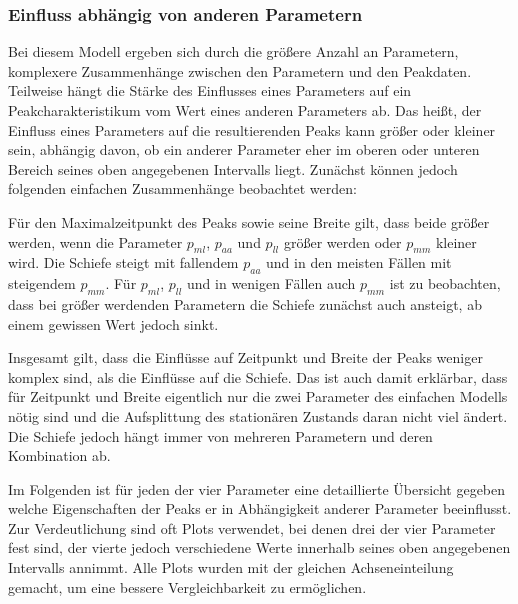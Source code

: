 

\subsubsection{Einfluss abhängig von anderen Parametern}

Bei diesem Modell ergeben sich durch die größere Anzahl an Parametern, komplexere Zusammenhänge zwischen den Parametern und den Peakdaten. Teilweise hängt die Stärke des Einflusses eines Parameters auf ein Peakcharakteristikum vom Wert eines anderen Parameters ab. Das heißt, der Einfluss eines Parameters auf die resultierenden Peaks kann größer oder kleiner sein, abhängig davon, ob ein anderer Parameter eher im oberen oder unteren Bereich seines oben angegebenen Intervalls liegt.
Zunächst können jedoch folgenden einfachen Zusammenhänge beobachtet werden:

Für den Maximalzeitpunkt des Peaks sowie seine Breite gilt, dass beide größer werden, wenn die Parameter $p_{ml}$, $p_{aa}$ und $p_{ll}$ größer werden oder $p_{mm}$ kleiner wird. 
Die Schiefe steigt mit fallendem $p_{aa}$ und in den meisten Fällen mit steigendem $p_{mm}$. Für $p_{ml}$, $p_{ll}$ und in wenigen Fällen auch $p_{mm}$ ist zu beobachten, dass bei größer werdenden Parametern die Schiefe zunächst auch ansteigt, ab einem gewissen Wert jedoch sinkt.

Insgesamt gilt, dass die Einflüsse auf Zeitpunkt und Breite der Peaks weniger komplex sind, als die Einflüsse auf die Schiefe. Das ist auch damit erklärbar, dass für Zeitpunkt und Breite eigentlich nur die zwei Parameter des einfachen Modells nötig sind und die Aufsplittung des stationären Zustands daran nicht viel ändert. Die Schiefe jedoch hängt immer von mehreren Parametern und deren Kombination ab.

Im Folgenden ist für jeden der vier Parameter eine detaillierte Übersicht gegeben welche Eigenschaften der Peaks er in Abhängigkeit anderer Parameter beeinflusst. Zur Verdeutlichung sind oft Plots verwendet, bei denen drei der vier Parameter fest sind, der vierte jedoch verschiedene Werte innerhalb seines oben angegebenen Intervalls annimmt. Alle Plots wurden mit der gleichen Achseneinteilung gemacht, um eine bessere Vergleichbarkeit zu ermöglichen.


